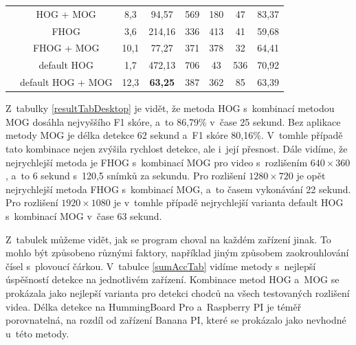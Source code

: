 \begin{table}[H]
\begin{tabular}{|c|c|c|c|c|c|c|c|}
                              & HOG + MOG &            8,3       & 94,57  & 569 &    180 &     47 &      83,37      \\ \cline{2-8}  
                              & FHOG &                 3,6       & 214,16  & 336 &   413 &     41 &      59,68    \\ \cline{2-8}  
                              & FHOG + MOG &           10,1      & 77,27  & 371 &    378 &     32 &      64,41    \\ \cline{2-8}   
                              &  default HOG &         1,7       & 472,13  & 706 &   43 &      536 &     70,92    \\ \cline{2-8}  
                              &  default HOG + MOG &   12,3      & \textbf{63,25}  & 387 &    362 &     85 &      63,39    \\ \hline
\end{tabular}
\end{table}
Z~tabulky \ref{resultTabDesktop} je vidět, že metoda HOG s~kombinací metodou MOG dosáhla nejvyššího F1 skóre, a~to 86,79\% v~čase 25 sekund. Bez aplikace metody MOG je délka detekce 62 sekund a~F1 skóre 80,16\%. V~tomhle případě tato kombinace nejen zvýšila rychlost detekce, ale i~její přesnost. Dále vidíme, že nejrychlejší metoda je FHOG s~kombinací MOG pro video s~rozlišením $640\times360$, a~to 6 sekund s~120,5 snímků za sekundu. Pro rozlišení $1280\times720$  je opět nejrychlejší metoda FHOG s~kombinací MOG, a~to časem vykonávání 22 sekund. Pro rozlišení $1920\times1080$ je v~tomhle případě nejrychlejší varianta default HOG s~kombinací MOG v~čase 63 sekund.


Z~tabulek můžeme vidět, jak se program choval na každém zařízení jinak. To mohlo být způsobeno různými faktory, například jiným způsobem zaokrouhlování čísel s~plovoucí čárkou. 
V~tabulce \ref{sumAccTab} vidíme metody s~nejlepší úspěšností detekce na jednotlivém zařízení. Kombinace metod HOG a~MOG se prokázala jako nejlepší varianta pro detekci chodců na všech testovaných rozlišení videa. Délka detekce na HummingBoard Pro a~Raspberry PI je téměř porovnatelná, na rozdíl od zařízení Banana PI, které se prokázalo jako nevhodné u~této metody. 

